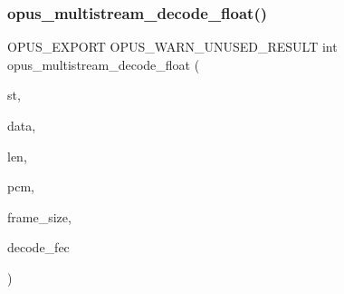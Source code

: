 \subsubsection{\texorpdfstring{opus\_multistream\_decode\_float()}{opus\_multistream\_decode\_float()}}
{\footnotesize\ttfamily O\+P\+U\+S\+\_\+\+E\+X\+P\+O\+RT O\+P\+U\+S\+\_\+\+W\+A\+R\+N\+\_\+\+U\+N\+U\+S\+E\+D\+\_\+\+R\+E\+S\+U\+LT int opus\+\_\+multistream\+\_\+decode\+\_\+float (\begin{DoxyParamCaption}\item[{\mbox{\hyperlink{group__opus__multistream_gad3497495deb9a8ace82e76cd4f93e0e4}{Opus\+M\+S\+Decoder}} $\ast$}]{st,  }\item[{const unsigned char $\ast$}]{data,  }\item[{\mbox{\hyperlink{opus__types_8h_aa4d309d6f80b99dbabebc8f98879ab9a}{opus\+\_\+int32}}}]{len,  }\item[{float $\ast$}]{pcm,  }\item[{int}]{frame\+\_\+size,  }\item[{int}]{decode\+\_\+fec }\end{DoxyParamCaption})}

